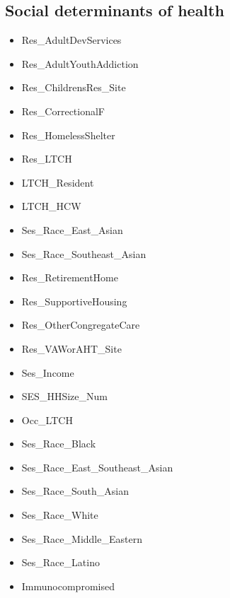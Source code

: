 \documentclass{article}
\begin{document}
\subsection{Social determinants of health}

\begin{itemize}
    \item Res\_AdultDevServices
    \item Res\_AdultYouthAddiction
    \item Res\_ChildrensRes\_Site
    \item Res\_CorrectionalF
    \item Res\_HomelessShelter
    \item Res\_LTCH
    \item LTCH\_Resident
    \item LTCH\_HCW
    \item Ses\_Race\_East\_Asian
    \item Ses\_Race\_Southeast\_Asian
    \item Res\_RetirementHome
    \item Res\_SupportiveHousing
    \item Res\_OtherCongregateCare
    \item Res\_VAWorAHT\_Site
    \item Ses\_Income
    \item SES\_HHSize\_Num
    \item Occ\_LTCH
    \item Ses\_Race\_Black
    \item Ses\_Race\_East\_Southeast\_Asian
    \item Ses\_Race\_South\_Asian
    \item Ses\_Race\_White
    \item Ses\_Race\_Middle\_Eastern
    \item Ses\_Race\_Latino
    \item Immunocompromised
\end{itemize}



\end{document}

